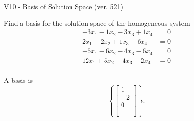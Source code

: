 \begin{exercise}
  \begin{exerciseTitle}V10 - Basis of Solution Space (ver. 521)\end{exerciseTitle}
  \begin{exerciseStatement}
    Find a basis for the solution space of the homogeneous system 
\begin{align*}
 -3 x_ 1 -1 x_ 2 -3 x_ 3 + 1 x_ 4 &= 0  \\ 
  2 x_ 1 -2 x_ 2 + 1 x_ 3 -6 x_ 4 &= 0  \\ 
  -6 x_ 1 -6 x_ 2 -4 x_ 3 -6 x_ 4 &= 0  \\ 
  12 x_ 1 + 5 x_ 2 -4 x_ 3 -2 x_ 4 &= 0  \\ 
 \end{align*}


 
  \end{exerciseStatement}

  \begin{exerciseAnswer}
   A basis is   
\[\left\{\left[\begin{array}{c}
1 \\
-2 \\
0 \\
1
\end{array}\right]\right\}.\]

  


  \end{exerciseAnswer}
\end{exercise}